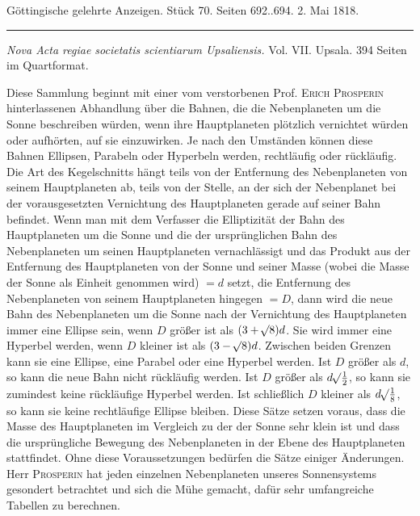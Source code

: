 \clearpage
{}
\hypertarget{native-609-lower}{}
\begin{center}\small Göttingische gelehrte Anzeigen. Stück 70. Seiten 692..694. 2. Mai 1818.\\[3pt]\rule{.72\linewidth}{.3pt}\end{center}

\emph{Nova Acta regiae societatis scientiarum Upsaliensis.} Vol. VII. Upsala. 394 Seiten im Quartformat.

\begingroup{}\relax
Diese Sammlung beginnt mit einer vom verstorbenen Prof. \textsc{Erich Prosperin} hinterlassenen Abhandlung über die Bahnen, die die Nebenplaneten um die Sonne beschreiben würden, wenn ihre Hauptplaneten plötzlich vernichtet würden oder aufhörten, auf sie einzuwirken.
Je nach den Umständen können diese Bahnen Ellipsen, Parabeln oder Hyperbeln werden, rechtläufig oder rückläufig.
Die Art des Kegelschnitts hängt teils von der Entfernung des Nebenplaneten von seinem Hauptplaneten ab, teils von der Stelle, an der sich der Nebenplanet bei der vorausgesetzten Vernichtung des Hauptplaneten gerade auf seiner Bahn befindet.
Wenn man mit dem Verfasser die Elliptizität der Bahn des Hauptplaneten um die Sonne und die der ursprünglichen Bahn des Nebenplaneten um seinen Hauptplaneten vernachlässigt und das Produkt aus der Entfernung des Hauptplaneten von der Sonne und seiner Masse (wobei die Masse der Sonne als Einheit genommen wird) $= d$ setzt, die Entfernung des Nebenplaneten von seinem Hauptplaneten hingegen $= D$, dann wird die neue Bahn des Nebenplaneten um die Sonne nach der Vernichtung des Hauptplaneten immer eine Ellipse sein, wenn $D$ größer ist als $(3+\mathord{{}^{}\!\surd}8)d$.
Sie wird immer eine Hyperbel werden, wenn $D$ kleiner ist als $(3-\mathord{{}^{}\!\surd}8)d$.
Zwischen beiden Grenzen kann sie eine Ellipse, eine Parabel oder eine Hyperbel werden.
Ist $D$ größer als $d$, so kann die neue Bahn nicht rückläufig werden.
Ist $D$ größer als $d\mathord{{}^{}\!\surd}\tfrac{1}{2}$, so kann sie zumindest keine rückläufige Hyperbel werden.
Ist schließlich $D$ kleiner als $d\mathord{{}^{}\!\surd}\tfrac{1}{8}$, so kann sie keine rechtläufige Ellipse bleiben.
Diese Sätze setzen voraus, dass die Masse des Hauptplaneten im Vergleich zu der der Sonne sehr klein ist und dass die ursprüngliche Bewegung des Nebenplaneten in der Ebene des Hauptplaneten stattfindet. Ohne diese Voraussetzungen bedürfen die Sätze einiger Änderungen.
Herr \textsc{Prosperin} hat jeden einzelnen Nebenplaneten unseres Sonnensystems gesondert betrachtet und sich die Mühe gemacht, dafür sehr umfangreiche Tabellen zu berechnen.
